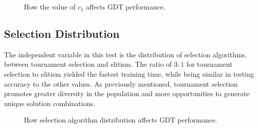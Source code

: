 \documentclass[12pt]{article}
\begin{document}
\begin{figure}[H]
    \centering
    \caption{How the value of $c_1$ affects GDT performance.}
\end{figure}

\subsection{Selection Distribution}

The independent variable in this test is the distribution of selection algorithms, between tournament selection and elitism. The ratio of $3:1$ for tournament selection to elitism yielded the fastest training time, while being similar in testing accuracy to the other values. As previously mentioned, tournament selection promotes greater diversity in the population and more opportunities to generate unique solution combinations.

\begin{figure}[H]
    \centering
    \caption{How selection algorithm distribution affects GDT performance.}
\end{figure}
\end{document}
